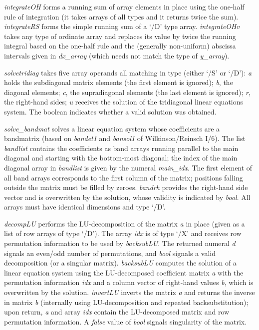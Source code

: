 \emph{integrateOH} forms a running sum of array elements in place using the one-half rule of integration (it takes arrays of all types and it returns twice the sum). \emph{integrateRS} forms the simple running sum of a `/D' type array. \emph{integrateOHv} takes any type of ordinate array and replaces its value by twice the running integral based on the one-half rule and the (generally non-uniform) abscissa intervals given in \emph{dx\_array} (which needs not match the type of \emph{y\_array}).

\emph{solvetridiag} takes five array operands all matching in type (either `/S' or `/D'): \emph{a} holds the subdiagonal matrix elements (the first element is ignored); \emph{b}, the diagonal elements; \emph{c}, the supradiagonal elements (the last element is ignored); \emph{r}, the right-hand sides; \emph{u} receives the solution of the tridiagonal linear equations system. The boolean indicates whether a valid solution was obtained.

\emph{solve\_bandmat} solves a linear equation system whose coefficients are a bandmatrix (based on \emph{bandet1} and \emph{bansol1} of Wilkinson/Reinsch I/6). The list \emph{bandlist} contains the coefficients as band arrays running parallel to the main diagonal and starting with the bottom-most diagonal; the index of the main diagonal array in \emph{bandlist} is given by the numeral \emph{main\_idx}. The first element of all band arrays corresponds to the first column of the matrix; positions falling outside the matrix must be filled by zeroes. \emph{bandrh} provides the right-hand side vector and is overwritten by the solution, whose validity is indicated by \emph{bool}. All arrays must have identical dimensions and type `/D'.

\emph{decompLU} performs the LU-decomposition of the matrix \emph{a} in place (given as a list of row arrays of type `/D'). The array \emph{idx} is of type `/X' and receives row permutation information to be used by \emph{backsubLU}. The returned numeral \emph{d} signals an even/odd number of permutations, and \emph{bool} signals a valid decomposition (or a singular matrix). \emph{backsubLU} computes the solution of a linear equation system using the LU-decomposed coefficient matrix \emph{a} with the permutation information \emph{idx} and a column vector of right-hand values \emph{b}, which is overwritten by the solution. \emph{invertLU} inverts the matrix \emph{a} and returns the inverse in matrix \emph{b} (internally using LU-decomposition and repeated backsubstitution); upon return, \emph{a} and array \emph{idx} contain the LU-decomposed matrix and row permutation information. A \emph{false} value of \emph{bool} signals singularity of the matrix.

